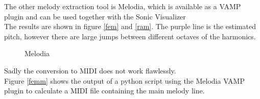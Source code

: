 The other melody extraction tool is Melodia\cite{melodia1}, which is available as a VAMP plugin and can be used together with the Sonic Visualizer\cite{sonviz1}\\
The results are shown in figure \ref{fem} and \ref{ram}.
The purple line is the estimated pitch, however there are large jumps between different octaves of the harmonics. 

\begin{figure}[htbp]
	\centering
	\caption{Melodia}
	\label{fig:melodia}
\end{figure}
\FloatBarrier
Sadly the conversion to MIDI does not work flawlessly.\\
Figure \ref{femm} shows the output of a python script using the Melodia VAMP plugin to calculate a MIDI file containing the main melody line.

